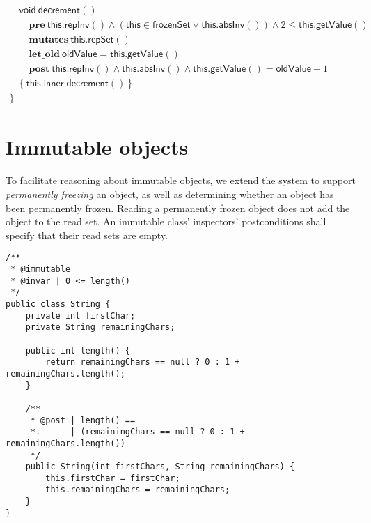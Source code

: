 \documentclass{article}
\begin{document}
$$\begin{array}{l}
\\
\quad \mathsf{void}\ \mathsf{decrement}()\\
\quad\quad \mathbf{pre}\ \mathsf{this}.\mathsf{repInv}() \land (\mathsf{this} \in \mathsf{frozenSet} \lor \mathsf{this}.\mathsf{absInv}()) \land 2 \le \mathsf{this}.\mathsf{getValue}()\\
\quad\quad \mathbf{mutates}\ \mathsf{this}.\mathsf{repSet}()\\
\quad\quad \mathbf{let\_old}\ \mathsf{oldValue} = \mathsf{this}.\mathsf{getValue}()\\
\quad\quad \mathbf{post}\ \mathsf{this}.\mathsf{repInv}() \land \mathsf{this}.\mathsf{absInv}() \land \mathsf{this}.\mathsf{getValue}() = \mathsf{oldValue} - 1\\
\quad \{\ \mathsf{this}.\mathsf{inner}.\mathsf{decrement}()\ \}\\
\}
\end{array}$$

\section{Immutable objects}

To facilitate reasoning about immutable objects, we extend the system to support \emph{permanently freezing} an object, as well as determining whether an object has been permanently frozen. Reading a permanently frozen object does not add the object to the read set. An immutable class' inspectors' postconditions shall specify that their read sets are empty.

\begin{verbatim}
/**
 * @immutable
 * @invar | 0 <= length()
 */
public class String {
    private int firstChar;
    private String remainingChars;
    
    public int length() {
        return remainingChars == null ? 0 : 1 + remainingChars.length();
    }
    
    /**
     * @post | length() ==
     *.      | (remainingChars == null ? 0 : 1 + remainingChars.length())
     */
    public String(int firstChars, String remainingChars) {
        this.firstChar = firstChar;
        this.remainingChars = remainingChars;
    }
}
\end{verbatim}
\end{document}
